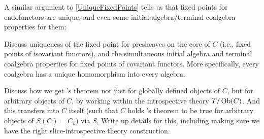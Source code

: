 A similar argument to \cref{UniqueFixedPoints} tells us that fixed points for endofunctors are unique, and even some initial algebra/terminal coalgebra properties for them: \TODO

\begin{TODOblock}
Discuss uniqueness of the fixed point for presheaves on the core of $C$ (i.e., fixed points of isovariant functors), and the simultaneous initial algebra and terminal coalgebra properties for fixed points of covariant functors. More specifically, every coalgebra has a unique homomorphism into every algebra.
\end{TODOblock}

\begin{TODOblock}
Discuss how we get \Loeb's theorem not just for globally defined objects of $C$, but for arbitrary objects of $C$, by working within the introspective theory $T/\operatorname{Ob}(C)$. And this transfers into $C$ itself (such that $C$ holds \Loeb's theorem to be true for arbitrary objects of $S(C) = C_1$) via $S$. Write up details for this, including making sure we have the right slice-introspective theory construction.
\end{TODOblock}